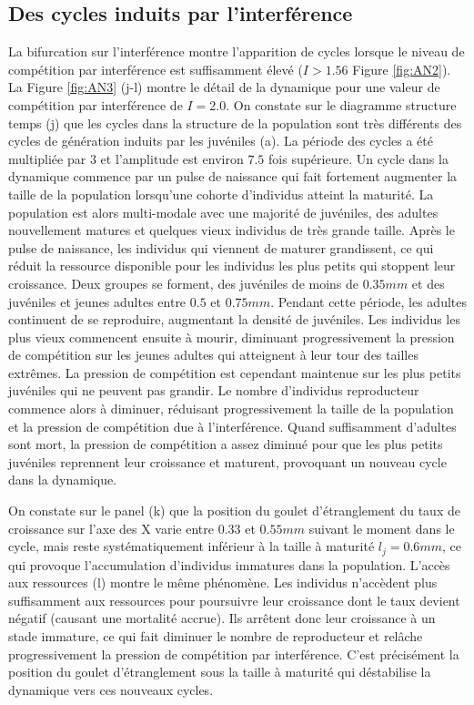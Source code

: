 \subsection{Des cycles induits par l'interférence}

La bifurcation sur l'interférence montre l'apparition de cycles lorsque le
niveau de compétition par interférence est suffisamment élevé ($I>1.56$ Figure
\ref{fig:AN2}). La Figure \ref{fig:AN3} (j-l) montre le détail de la dynamique
pour une valeur de compétition par interférence de $I=2.0$. On constate sur le
diagramme structure temps (j) que les cycles dans la structure de la population
sont très différents des cycles de génération induits par les juvéniles (a). La
période des cycles a été multipliée par $3$ et l'amplitude est environ $7.5$
fois supérieure. Un cycle dans la dynamique commence par un pulse de naissance
qui fait fortement augmenter la taille de la population lorsqu'une cohorte
d'individus atteint la maturité. La population est alors multi-modale avec une majorité
de juvéniles, des adultes nouvellement matures et quelques vieux individus de
très grande taille. Après le pulse de naissance, les individus qui viennent de
maturer grandissent, ce qui réduit la ressource disponible pour les individus
les plus petits qui stoppent leur croissance. Deux groupes se forment, des
juvéniles de moins de $0.35mm$ et des juvéniles et jeunes adultes entre $0.5$ et
$0.75mm$. Pendant cette période, les adultes continuent de se reproduire,
augmentant la densité de juvéniles. Les individus les plus vieux commencent
ensuite à mourir, diminuant progressivement la pression de compétition sur les
jeunes adultes qui atteignent à leur tour des tailles extrêmes. La pression de
compétition est cependant maintenue sur les plus petits juvéniles qui ne peuvent
pas grandir. Le nombre d'individus reproducteur commence alors à diminuer,
réduisant progressivement la taille de la population et la pression de
compétition due à l'interférence. Quand suffisamment d'adultes sont mort, la
pression de compétition a assez diminué pour que les plus petits juvéniles
reprennent leur croissance et maturent, provoquant un nouveau cycle dans la
dynamique. 

On constate sur le panel (k) que la position du goulet d'étranglement du taux de
croissance sur l'axe des X varie entre $0.33$ et $0.55mm$ suivant le moment dans
le cycle, mais reste systématiquement inférieur à la taille à maturité
$l_j=0.6mm$, ce qui provoque l'accumulation d'individus immatures dans la
population. L'accès aux ressources (l) montre le même phénomène. Les individus
n'accèdent plus suffisamment aux ressources pour poursuivre leur croissance dont
le taux devient négatif (causant une mortalité accrue). Ils arrêtent donc leur
croissance à un stade immature, ce qui fait diminuer le nombre de reproducteur
et relâche progressivement la pression de compétition par interférence. C'est
précisément la position du goulet d'étranglement sous la taille à maturité qui
déstabilise la dynamique vers ces nouveaux cycles. 

